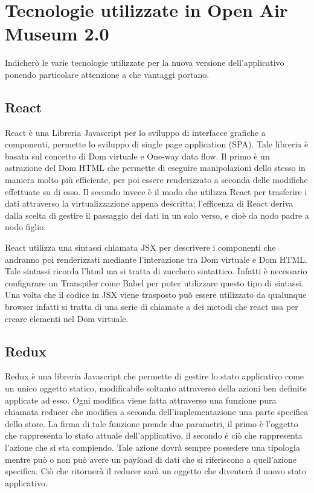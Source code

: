 \section{Tecnologie utilizzate in Open Air Museum 2.0}\vspace{5mm}
Indicherò le varie tecnologie utilizzate per la nuova versione dell'applicativo ponendo particolare attenzione a che vantaggi portano.\vspace{5mm}

	\subsection{React}\vspace{5mm}

React\cite{React} è una Libreria Javascript per lo sviluppo di interfacce grafiche a componenti, permette lo sviluppo di single page application (SPA). Tale libreria è basata sul concetto di Dom virtuale e One-way data flow. Il primo è un astrazione del Dom HTML che permette di eseguire manipolazioni dello stesso in maniera molto più efficiente, per poi essere renderizzato a seconda delle modifiche effettuate su di esso. Il secondo invece è il modo che utilizza React per trasferire i dati attraverso la virtualizzazione appena descritta; l'efficenza di React deriva dalla scelta di gestire il passaggio dei dati in un solo verso, e cioè da nodo padre a nodo figlio.\vspace{5mm}

React utilizza una sintassi chiamata JSX per descrivere i componenti che andranno poi renderizzati mediante l'interazione tra Dom virtuale e Dom HTML. Tale sintassi ricorda l'html ma si tratta di zucchero sintattico. Infatti è necessario configurare un Transpiler come Babel per poter utilizzare questo tipo di sintassi. Una volta che il codice in JSX viene trasposto può essere utilizzato da qualunque browser infatti si tratta di una serie di chiamate a dei metodi che react usa per creare elementi nel Dom virtuale.

	\subsection{Redux}\vspace{5mm}
	
	Redux è una libreria Javascript che permette di gestire lo stato applicativo come un unico oggetto statico, modificabile soltanto attraverso della azioni ben definite applicate ad esso. Ogni modifica viene fatta attraverso una funzione pura\cite{PureFunction} chiamata reducer che modifica a seconda dell'implementazione una parte specifica dello store. La firma di tale funzione prende due parametri, il primo è l'oggetto che rappresenta lo stato attuale dell'applicativo, il secondo è ciò che rappresenta l'azione che si sta compiendo. Tale azione dovrà sempre possedere una tipologia mentre può o non può avere un payload di dati che si riferiscono a quell'azione specifica. Ciò che ritornerà il reducer sarà un oggetto che diventerà il nuovo stato applicativo.\vspace{5mm}
	
